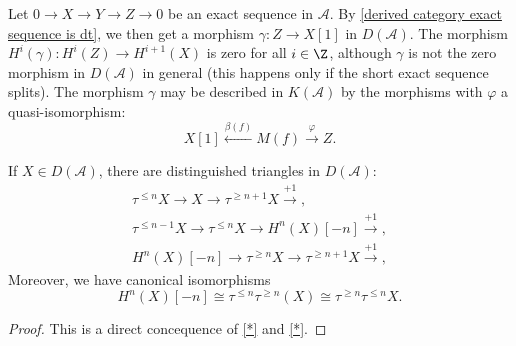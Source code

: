 \begin{remark}
Let $0\to X\to Y\to Z\to 0$ be an exact sequence in $\mathcal{A}$. By \cref{derived category exact sequence is dt}, we then get a morphism $\gamma:Z\to X[1]$ in $D(\mathcal{A})$. The morphism $H^i(\gamma):H^i(Z)\to H^{i+1}(X)$ is zero for all $i\in\Z$, although $\gamma$ is not the zero morphism in $D(\mathcal{A})$ in general (this happens only if the short exact sequence splits). The morphism $\gamma$ may be described in $K(\mathcal{A})$ by the morphisms with $\varphi$ a quasi-isomorphism:
\[X[1]\stackrel{\beta(f)}{\longleftarrow} M(f)\stackrel{\varphi}{\longrightarrow} Z.\]
\end{remark}

\begin{proposition}\label{derived category dt for truncation functor}
If $X\in D(\mathcal{A})$, there are distinguished triangles in $D(\mathcal{A})$:
\begin{gather}
\tau^{\leq n}X \longrightarrow X \longrightarrow \tau^{\geq n+1}X \stackrel{+1}{\longrightarrow},\label{derived category dt for truncation functor-1}\\
\tau^{\leq n-1}X \longrightarrow \tau^{\leq n}X \longrightarrow H^n(X)[-n] \stackrel{+1}{\longrightarrow},\label{derived category dt for truncation functor-2}\\
H^n(X)[-n] \longrightarrow \tau^{\geq n}X \longrightarrow \tau^{\geq n+1}X \stackrel{+1}{\longrightarrow},\label{derived category dt for truncation functor-3}
\end{gather}
Moreover, we have canonical isomorphisms
\begin{equation}\label{derived category dt for truncation functor-4}
H^n(X)[-n]\cong\tau^{\leq n}\tau^{\geq n}(X)\cong \tau^{\geq n}\tau^{\leq n}X.
\end{equation}
\end{proposition}
\begin{proof}
This is a direct concequence of \cref{*} and \cref{*}.
\end{proof}

